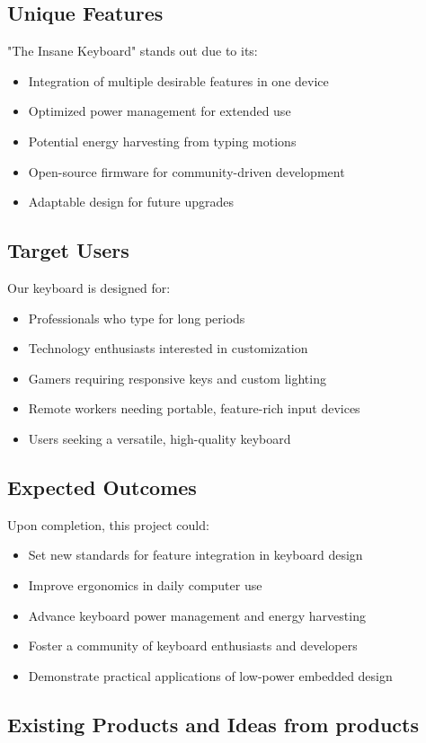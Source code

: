 \documentclass[a4paper,11pt]{article}%
\begin{document}
\subsection{Unique Features}
"The Insane Keyboard" stands out due to its:
\begin{itemize}
    \item Integration of multiple desirable features in one device
    \item Optimized power management for extended use
    \item Potential energy harvesting from typing motions
    \item Open-source firmware for community-driven development
    \item Adaptable design for future upgrades
\end{itemize}
\subsection{Target Users}
Our keyboard is designed for:
\begin{itemize}
    \item Professionals who type for long periods
    \item Technology enthusiasts interested in customization
    \item Gamers requiring responsive keys and custom lighting
    \item Remote workers needing portable, feature-rich input devices
    \item Users seeking a versatile, high-quality keyboard
\end{itemize}
\subsection{Expected Outcomes}
Upon completion, this project could:
\begin{itemize}
    \item Set new standards for feature integration in keyboard design
    \item Improve ergonomics in daily computer use
    \item Advance keyboard power management and energy harvesting
    \item Foster a community of keyboard enthusiasts and developers
    \item Demonstrate practical applications of low-power embedded design
\end{itemize}

\subsection{Existing Products and Ideas from products}
\end{document}
